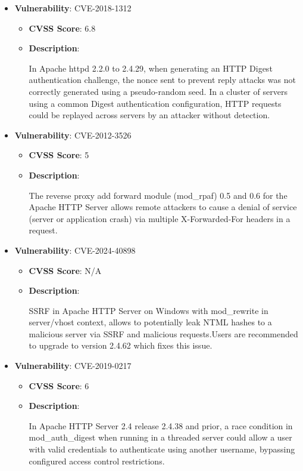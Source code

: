 \documentclass{article}
\begin{document}
\begin{itemize}
        \item \textbf{Vulnerability}: CVE-2018-1312
        \begin{itemize}
            \item \textbf{CVSS Score}:  6.8 
            \item \textbf{Description}:
            \parbox[t]{0.9\linewidth}{
                \ttfamily In Apache httpd 2.2.0 to 2.4.29, when generating an HTTP Digest authentication challenge, the nonce sent to prevent reply attacks was not correctly generated using a pseudo-random seed. In a cluster of servers using a common Digest authentication configuration, HTTP requests could be replayed across servers by an attacker without detection.
            }
        \end{itemize}
    
        \item \textbf{Vulnerability}: CVE-2012-3526
        \begin{itemize}
            \item \textbf{CVSS Score}:  5 
            \item \textbf{Description}:
            \parbox[t]{0.9\linewidth}{
                \ttfamily The reverse proxy add forward module (mod\_rpaf) 0.5 and 0.6 for the Apache HTTP Server allows remote attackers to cause a denial of service (server or application crash) via multiple X-Forwarded-For headers in a request.
            }
        \end{itemize}
    
        \item \textbf{Vulnerability}: CVE-2024-40898
        \begin{itemize}
            \item \textbf{CVSS Score}:  N/A 
            \item \textbf{Description}:
            \parbox[t]{0.9\linewidth}{
                \ttfamily SSRF in Apache HTTP Server on Windows with mod\_rewrite in server/vhost context, allows to potentially leak NTML hashes to a malicious server via SSRF and malicious requests.Users are recommended to upgrade to version 2.4.62 which fixes this issue.
            }
        \end{itemize}
    
        \item \textbf{Vulnerability}: CVE-2019-0217
        \begin{itemize}
            \item \textbf{CVSS Score}:  6 
            \item \textbf{Description}:
            \parbox[t]{0.9\linewidth}{
                \ttfamily In Apache HTTP Server 2.4 release 2.4.38 and prior, a race condition in mod\_auth\_digest when running in a threaded server could allow a user with valid credentials to authenticate using another username, bypassing configured access control restrictions.
            }
        \end{itemize}
    

\end{itemize}
\end{document}
